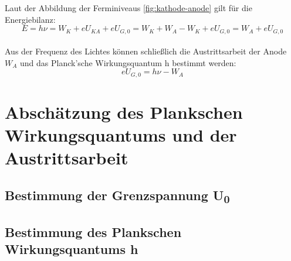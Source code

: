 Laut der Abbildung der Ferminiveaus \ref{fig:kathode-anode} 
gilt für die Energiebilanz:
\begin{equation}
    E = h\nu = W_K + eU_{KA} + eU_{G,0} 
    = W_K + W_A - W_K + eU_{G,0} 
    = W_A + eU_{G,0}
\end{equation}\\
Aus der Frequenz des Lichtes können 
schließlich
die Austrittsarbeit der Anode $W_A$ und 
das Planck’sche Wirkungsquantum h bestimmt 
werden:
\begin{equation}
    eU_{G,0} = h\nu - W_A
\end{equation}
\section{Abschätzung des Plankschen Wirkungsquantums und der Austrittsarbeit}
\subsection[Bestimmung der Grenzspannung U0]{Bestimmung der Grenzspannung U\textsubscript{0}}
\subsection[Bestimmung des Plankschen Wirkungsquantums h]{Bestimmung des Plankschen Wirkungsquantums h}
\begin{table}[H]
\centering
{}
\caption{Gemittelte Abbrems­spannungen $\overline{U_0}$ und deren Unsicherheiten gegen die jeweiligen Frequenzen.}
\label{tab:U0_vs_nu_data}
\end{table}

